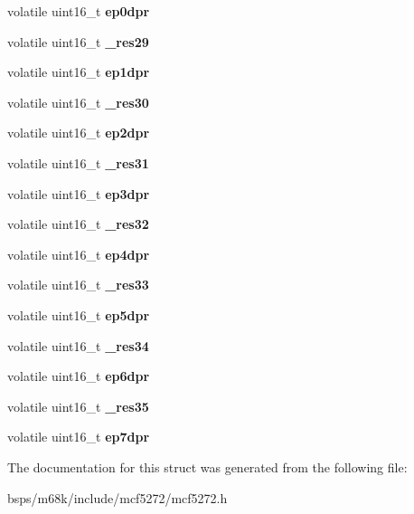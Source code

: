 \begin{DoxyCompactItemize}
volatile uint16\+\_\+t {\bfseries ep0dpr}
\item 
\mbox{\label{structusb__regs__t_a80d908862a8ddcb501ea936486221545}} 
volatile uint16\+\_\+t {\bfseries \+\_\+res29}
\item 
\mbox{\label{structusb__regs__t_af9d8307c1d53347199929a7984fb1c43}} 
volatile uint16\+\_\+t {\bfseries ep1dpr}
\item 
\mbox{\label{structusb__regs__t_aa216f604fe5a99c109689105b43d963b}} 
volatile uint16\+\_\+t {\bfseries \+\_\+res30}
\item 
\mbox{\label{structusb__regs__t_af998675ddb494d9096034626bfb63f7a}} 
volatile uint16\+\_\+t {\bfseries ep2dpr}
\item 
\mbox{\label{structusb__regs__t_ad5c96bf8f6e9743fcd12058a09338b31}} 
volatile uint16\+\_\+t {\bfseries \+\_\+res31}
\item 
\mbox{\label{structusb__regs__t_a66c2ef04c40984bc1a9103a475a2035f}} 
volatile uint16\+\_\+t {\bfseries ep3dpr}
\item 
\mbox{\label{structusb__regs__t_a718d3096e02b64df74abf5e5e7539b5c}} 
volatile uint16\+\_\+t {\bfseries \+\_\+res32}
\item 
\mbox{\label{structusb__regs__t_a5c4c51261ab0e91778d28d1facc6663b}} 
volatile uint16\+\_\+t {\bfseries ep4dpr}
\item 
\mbox{\label{structusb__regs__t_a8ab924fe836cb91c416a4fa70fa735fb}} 
volatile uint16\+\_\+t {\bfseries \+\_\+res33}
\item 
\mbox{\label{structusb__regs__t_abfe570b57374036d1219915cede52c95}} 
volatile uint16\+\_\+t {\bfseries ep5dpr}
\item 
\mbox{\label{structusb__regs__t_af6d88801ae540ba2f6abb8651c5c329e}} 
volatile uint16\+\_\+t {\bfseries \+\_\+res34}
\item 
\mbox{\label{structusb__regs__t_a75498da4344496e76b48d6a4116e6182}} 
volatile uint16\+\_\+t {\bfseries ep6dpr}
\item 
\mbox{\label{structusb__regs__t_a194565aecbb683e750724390ff14e856}} 
volatile uint16\+\_\+t {\bfseries \+\_\+res35}
\item 
\mbox{\label{structusb__regs__t_ad40871609cbc2af79ff7b2810b6bc91c}} 
volatile uint16\+\_\+t {\bfseries ep7dpr}
\end{DoxyCompactItemize}


The documentation for this struct was generated from the following file\+:\begin{DoxyCompactItemize}
\item 
bsps/m68k/include/mcf5272/mcf5272.\+h\end{DoxyCompactItemize}

